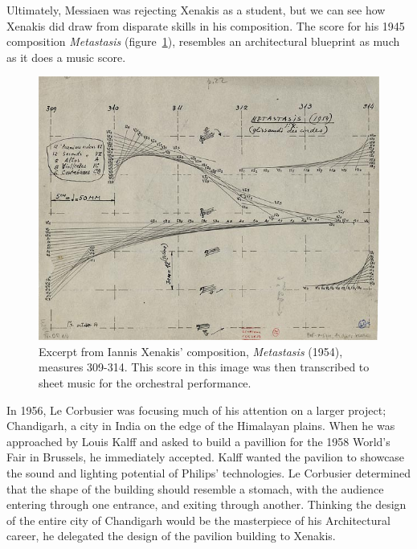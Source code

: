 \documentclass{tufte-book}
\begin{document}
Ultimately, Messiaen was rejecting Xenakis as a student, but we can
see how Xenakis did draw from disparate skills in his composition. The
score for his 1945 composition \textit{Metastasis}
(figure~\ref{fig:metastasis}), resembles an architectural blueprint as
much as it does a music score.

\begin{figure}[h]
  \includegraphics[width=\linewidth]{XenakisMetastasis.jpg}
  \caption{Excerpt from Iannis Xenakis' composition,
    \textit{Metastasis} (1954), measures 309-314. This score in this
    image was then transcribed to sheet music for the orchestral
    performance.}
  \label{fig:metastasis}
\end{figure}

In 1956, Le Corbusier was focusing much of his attention on a larger
project; Chandigarh, a city in India on the edge of the Himalayan
plains. When he was approached by Louis Kalff and asked to build a
pavillion for the 1958 World's Fair in Brussels, he immediately
accepted. Kalff wanted the pavilion to showcase the sound and lighting
potential of Philips' technologies. Le Corbusier determined that
the shape of the building should resemble a stomach, with the audience
entering through one entrance, and exiting through another. Thinking
the design of the entire city of Chandigarh would be the masterpiece
of his Architectural career,\cite{Flint2013} he delegated the design
of the pavilion building to Xenakis.\cite{Clarke2012}
\end{document}
